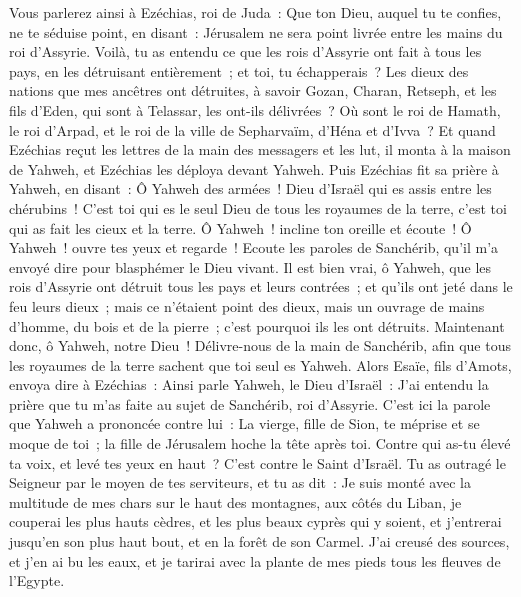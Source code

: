\begin{multicols}{2}
Vous parlerez ainsi à Ezéchias, roi de Juda~: Que ton Dieu, auquel tu te confies, ne te séduise point, en disant~: Jérusalem ne sera point livrée entre les mains du roi d'Assyrie.
Voilà, tu as entendu ce que les rois d'Assyrie ont fait à tous les pays, en les détruisant entièrement~; et toi, tu échapperais~?
Les dieux des nations que mes ancêtres ont détruites, à savoir Gozan, Charan, Retseph, et les fils d'Eden, qui sont à Telassar, les ont-ils délivrées~?
Où sont le roi de Hamath, le roi d'Arpad, et le roi de la ville de Sepharvaïm, d'Héna et d'Ivva~?
Et quand Ezéchias reçut les lettres de la main des messagers et les lut, il monta à la maison de Yahweh, et Ezéchias les déploya devant Yahweh.
Puis Ezéchias fit sa prière à Yahweh, en disant~:
Ô Yahweh des armées~! Dieu d'Israël qui es assis entre les chérubins~! C'est toi qui es le seul Dieu de tous les royaumes de la terre, c'est toi qui as fait les cieux et la terre.
Ô Yahweh~! incline ton oreille et écoute~! Ô Yahweh~! ouvre tes yeux et regarde~! Ecoute les paroles de Sanchérib, qu'il m'a envoyé dire pour blasphémer le Dieu vivant.
Il est bien vrai, ô Yahweh, que les rois d'Assyrie ont détruit tous les pays et leurs contrées~;
et qu'ils ont jeté dans le feu leurs dieux~; mais ce n'étaient point des dieux, mais un ouvrage de mains d'homme, du bois et de la pierre~; c'est pourquoi ils les ont détruits.
Maintenant donc, ô Yahweh, notre Dieu~! Délivre-nous de la main de Sanchérib, afin que tous les royaumes de la terre sachent que toi seul es Yahweh.
Alors Esaïe, fils d'Amots, envoya dire à Ezéchias~: Ainsi parle Yahweh, le Dieu d'Israël~: J'ai entendu la prière que tu m'as faite au sujet de Sanchérib, roi d'Assyrie.
C'est ici la parole que Yahweh a prononcée contre lui~: La vierge, fille de Sion, te méprise et se moque de toi~; la fille de Jérusalem hoche la tête après toi.
Contre qui as-tu élevé ta voix, et levé tes yeux en haut~? C'est contre le Saint d'Israël.
Tu as outragé le Seigneur par le moyen de tes serviteurs, et tu as dit~: Je suis monté avec la multitude de mes chars sur le haut des montagnes, aux côtés du Liban, je couperai les plus hauts cèdres, et les plus beaux cyprès qui y soient, et j'entrerai jusqu'en son plus haut bout, et en la forêt de son Carmel.
J'ai creusé des sources, et j'en ai bu les eaux, et je tarirai avec la plante de mes pieds tous les fleuves de l'Egypte.

\end{multicols}
